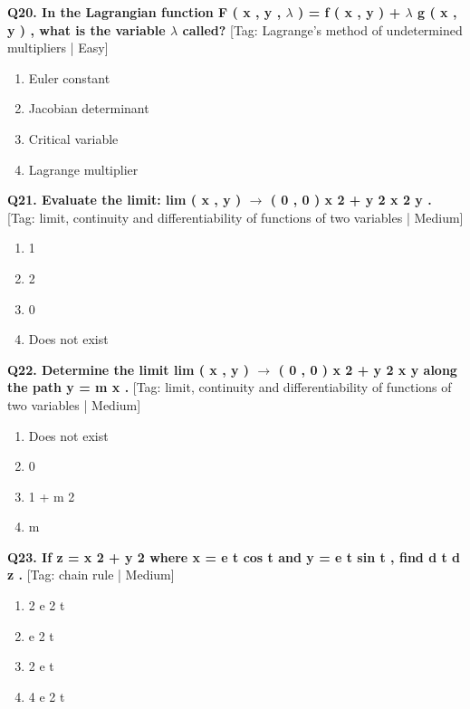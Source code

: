 \noindent\textbf{Q20. In the Lagrangian function F ( x , y , $\lambda$ ) = f ( x , y ) + $\lambda$ g ( x , y ) , what is the variable $\lambda$ called?} \hfill [Tag: Lagrange's method of undetermined multipliers | Easy]
\begin{enumerate}[label=(\alph*),topsep=2pt,itemsep=1pt,partopsep=0pt,parsep=0pt]
    \item {{Euler constant}}
    \item {{Jacobian determinant}}
    \item {{Critical variable}}
    \item {{Lagrange multiplier}}
\end{enumerate}
\vspace{2mm}

\noindent\textbf{Q21. Evaluate the limit: lim ( x , y ) $\to$ ( 0 , 0 ) x 2 + y 2 x 2 y .} \hfill [Tag: limit, continuity and differentiability of functions of two variables | Medium]
\begin{enumerate}[label=(\alph*),topsep=2pt,itemsep=1pt,partopsep=0pt,parsep=0pt]
    \item {{1}}
    \item {{2}}
    \item {{0}}
    \item {{Does not exist}}
\end{enumerate}
\vspace{2mm}

\noindent\textbf{Q22. Determine the limit lim ( x , y ) $\to$ ( 0 , 0 ) x 2 + y 2 x y along the path y = m x .} \hfill [Tag: limit, continuity and differentiability of functions of two variables | Medium]
\begin{enumerate}[label=(\alph*),topsep=2pt,itemsep=1pt,partopsep=0pt,parsep=0pt]
    \item {{Does not exist}}
    \item {{0}}
    \item {{1 + m 2}}
    \item {{m}}
\end{enumerate}
\vspace{2mm}

\noindent\textbf{Q23. If z = x 2 + y 2 where x = e t cos t and y = e t sin t , find d t d z .} \hfill [Tag: chain rule | Medium]
\begin{enumerate}[label=(\alph*),topsep=2pt,itemsep=1pt,partopsep=0pt,parsep=0pt]
    \item {{2 e 2 t}}
    \item {{e 2 t}}
    \item {{2 e t}}
    \item {{4 e 2 t}}
\end{enumerate}
\vspace{2mm}

